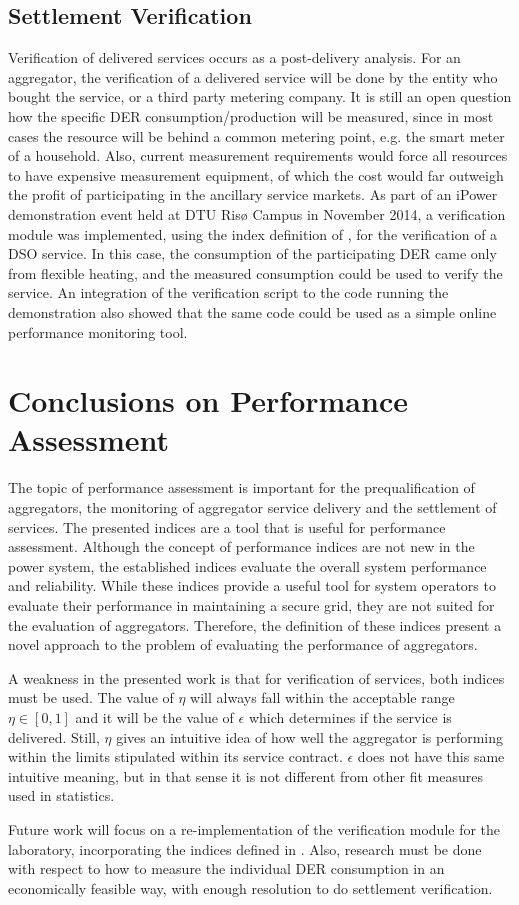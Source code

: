 \subsection{Settlement Verification}
Verification of delivered services occurs as a post-delivery analysis. For an aggregator, the verification of a delivered service will be done by the entity who bought the service, or a third party metering company. It is still an open question how the specific DER consumption/production will be measured, since in most cases the resource will be behind a common metering point, e.g. the smart meter of a household. Also, current measurement requirements would force all resources to have expensive measurement equipment, of which the cost would far outweigh the profit of participating in the ancillary service markets. As part of an iPower demonstration event held at DTU Risø Campus in November 2014, a verification module was implemented, using the index definition of \cite{bondy2014performance}, for the verification of a DSO service. In this case, the consumption of the participating DER came only from flexible heating, and the measured consumption could be used to verify the service. An integration of the verification script to the code running the demonstration also showed that the same code could be used as a simple online performance monitoring tool.

\section{Conclusions on Performance Assessment}
The topic of performance assessment is important for the prequalification of aggregators, the monitoring of aggregator service delivery and the settlement of services. The presented indices are a tool that is useful for performance assessment. Although the concept of performance indices are not new in the power system, the established indices evaluate the overall system performance and reliability. While these indices provide a useful tool for system operators to evaluate their performance in maintaining a secure grid, they are not suited for the evaluation of aggregators. Therefore, the definition of these indices present a novel approach to the problem of evaluating the performance of aggregators.

A weakness in the presented work is that for verification of services, both indices must be used. The value of $\eta$ will always fall within the acceptable range $\eta \in [0,1]$ and it will be the value of $\epsilon$ which determines if the service is delivered. Still, $\eta$ gives an intuitive idea of how well the aggregator is performing within the limits stipulated within its service contract. $\epsilon$ does not have this same intuitive meaning, but in that sense it is not different from other fit measures used in statistics.

Future work will focus on a re-implementation of the verification module for the laboratory, incorporating the indices defined in \cite{bondy2016method}. Also, research must be done with respect to how to measure the individual DER consumption in an economically feasible way, with enough resolution to do settlement verification.

